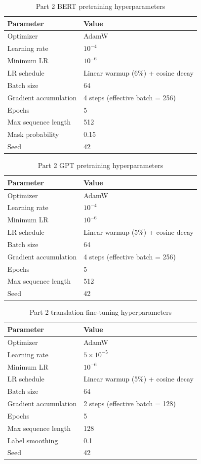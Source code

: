 \documentclass[12pt,a4paper]{article}
\begin{document}
\begin{table}[H]
\centering
\caption{Part 2 BERT pretraining hyperparameters}
\begin{tabular}{ll}
\toprule
\textbf{Parameter} & \textbf{Value} \\
\midrule
Optimizer & AdamW \\
Learning rate & $10^{-4}$ \\
Minimum LR & $10^{-6}$ \\
LR schedule & Linear warmup (6\%) + cosine decay \\
Batch size & 64 \\
Gradient accumulation & 4 steps (effective batch = 256) \\
Epochs & 5 \\
Max sequence length & 512 \\
Mask probability & 0.15 \\
Seed & 42 \\
\bottomrule
\end{tabular}
\end{table}

\begin{table}[H]
\centering
\caption{Part 2 GPT pretraining hyperparameters}
\begin{tabular}{ll}
\toprule
\textbf{Parameter} & \textbf{Value} \\
\midrule
Optimizer & AdamW \\
Learning rate & $10^{-4}$ \\
Minimum LR & $10^{-6}$ \\
LR schedule & Linear warmup (5\%) + cosine decay \\
Batch size & 64 \\
Gradient accumulation & 4 steps (effective batch = 256) \\
Epochs & 5 \\
Max sequence length & 512 \\
Seed & 42 \\
\bottomrule
\end{tabular}
\end{table}

\begin{table}[H]
\centering
\caption{Part 2 translation fine-tuning hyperparameters}
\begin{tabular}{ll}
\toprule
\textbf{Parameter} & \textbf{Value} \\
\midrule
Optimizer & AdamW \\
Learning rate & $5 \times 10^{-5}$ \\
Minimum LR & $10^{-6}$ \\
LR schedule & Linear warmup (5\%) + cosine decay \\
Batch size & 64 \\
Gradient accumulation & 2 steps (effective batch = 128) \\
Epochs & 5 \\
Max sequence length & 128 \\
Label smoothing & 0.1 \\
Seed & 42 \\
\bottomrule
\end{tabular}
\end{table}
\end{document}
